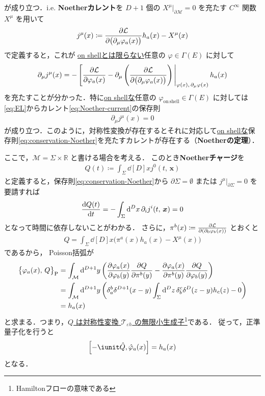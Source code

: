 \documentclass[TQFT_main]{subfiles}
\begin{document}
が成り立つ．i.e. \textbf{Noetherカレント}を $D+1$ 個の $X^\mu|_{\partial \mathcal{M}} = 0$ を充たす $C^\infty$ 関数 $X^\mu$ を用いて
\begin{align}
    \label{eq:Noether-current}
    j^\mu(x) \coloneqq \pdv{\mathcal{L}}{\bigl(\partial_\mu\varphi_a(x)\bigr)} h_a (x) - X^\mu(x)
\end{align}
で定義すると，これが \underline{on shellとは限らない}任意の $\varphi \in \Gamma(E)$ に対して
\begin{align}
    \label{eq:quasi-conservation-Noether}
    \partial_\mu j^\mu (x) = - \eval[\pdv{\mathcal{L}}{\varphi_a(x)} - \partial_\mu \left(\pdv{\mathcal{L}}{\bigl(\partial_\mu\varphi_a(x)\bigr)}\right)|_{\varphi(x),\, \partial_\mu \varphi(x)} h_a(x)
\end{align}
を充たすことが分かった．特に\underline{on shellな}任意の $\varphi_{\mathrm{on\, shell}} \in \Gamma(E)$ に対しては\eqref{eq:EL}からカレント\eqref{eq:Noether-current}の保存則
\begin{align}
    \label{eq:conservation-Noether}
    \partial_\mu j^\mu(x) = 0
\end{align}
が成り立つ．このように，対称性変換が存在するとそれに対応して\underline{on shellな}保存則\eqref{eq:conservation-Noether}を充たすカレントが存在する（\textbf{Noetherの定理}）．

ここで，$\mathcal{M} = \Sigma \times \mathbb{R}$ と書ける場合を考える．
このとき\textbf{Noetherチャージ}を
\begin{align}
    Q(t) \coloneqq \int_\Sigma \dd[D]{x} j^0(t,\, \bm{x})
\end{align}
と定義すると，保存則\eqref{eq:conservation-Noether}から
$\partial \Sigma = \emptyset$ または $j^\mu|_{\partial\Sigma} = 0$ を要請すれば
\begin{align}
    \dv{Q(t)}{t} = - \int_{\Sigma} \dd[D]{x} \partial_i j^i(t,\, \bm{x}) = 0
\end{align}
となって時間に依存しないことがわかる．
さらに，$\pi^b(x) \coloneqq \pdv{\mathcal{L}}{(\partial_0 \varphi_b(x))}$ とおくと
\begin{align}
    Q = \int_\Sigma \dd[D]{x} \bigl( \pi^a(x) h_a(x) - X^\mu(x) \bigr) 
\end{align}
であるから，
Poisson括弧が
\begin{align}
    \bigl\{\varphi_a(x),\, Q\bigr\}_{\mathrm{P}}
    &= \int_{\mathcal{M}} \dd[D+1]{y} \left(\pdv{\varphi_a(x)}{\varphi_b(y)} \pdv{Q}{\pi^b(y)} - \pdv{\varphi_a(x)}{\pi^b(y)} \pdv{Q}{\varphi_b(y)}\right) \\
    &= \int_{\mathcal{M}} \dd[D+1]{y} \left(\delta_a^b \delta^{D+1}(x-y) \int_\Sigma \dd[D]{z} \delta_b^c \delta^D(z-y) h_c(z) - 0 \right) \\
    &= h_a(x)
\end{align}
と求まる．つまり，\underline{$Q$ は対称性変換 $\mathcal{T}_{\varepsilon h}$ の無限小生成子}\footnote{Hamiltonフローの意味である}である．
従って，正準量子化を行うと
\begin{align}
    \label{eq:generator-Q}
    \comm{-\iunit\hat{Q}}{\hat{\varphi}_a(x)} = h_a(x)
\end{align}
となる．
\end{document}
